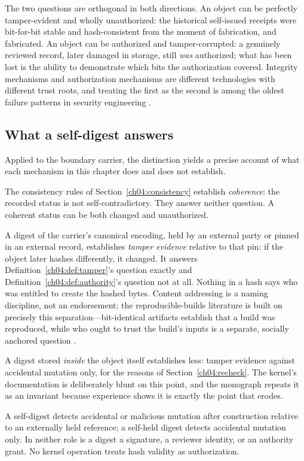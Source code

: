 The two questions are orthogonal in both directions. An object can be
perfectly tamper-evident and wholly unauthorized: the historical self-issued
receipts were bit-for-bit stable and hash-consistent from the moment of
fabrication, and fabricated. An object can be authorized and
tamper-corrupted: a genuinely reviewed record, later damaged in storage,
still \emph{was} authorized; what has been lost is the ability to
demonstrate which bits the authorization covered. Integrity mechanisms and
authorization mechanisms are different technologies with different trust
roots, and treating the first as the second is among the oldest failure
patterns in security engineering \cite{anderson}.

\subsection{What a self-digest answers}

Applied to the boundary carrier, the distinction yields a precise account of
what each mechanism in this chapter does and does not establish.

The consistency rules of Section~\ref{ch04:consistency} establish
\emph{coherence}: the recorded status is not self-contradictory. They answer
neither question. A coherent status can be both changed and unauthorized.

A digest of the carrier's canonical encoding, held by an external party or
pinned in an external record, establishes \emph{tamper evidence} relative to
that pin: if the object later hashes differently, it changed. It answers
Definition~\ref{ch04:def:tamper}'s question exactly and
Definition~\ref{ch04:def:authority}'s question not at all. Nothing in a hash
says who was entitled to create the hashed bytes. Content addressing is a
naming discipline, not an endorsement; the reproducible-builds literature is
built on precisely this separation---bit-identical artifacts establish that
a build was reproduced, while who ought to trust the build's inputs is a
separate, socially anchored question \cite{reprobuilds}.

A digest stored \emph{inside} the object itself establishes less: tamper
evidence against accidental mutation only, for the reasons of
Section~\ref{ch04:recheck}. The kernel's documentation is deliberately blunt
on this point, and the monograph repeats it as an invariant because
experience shows it is exactly the point that erodes.

\begin{invariant}\label{ch04:inv:selfdigest}
A self-digest detects accidental or malicious mutation after construction
relative to an externally held reference; a self-held digest detects
accidental mutation only. In neither role is a digest a signature, a
reviewer identity, or an authority grant. No kernel operation treats hash
validity as authorization.
\end{invariant}

